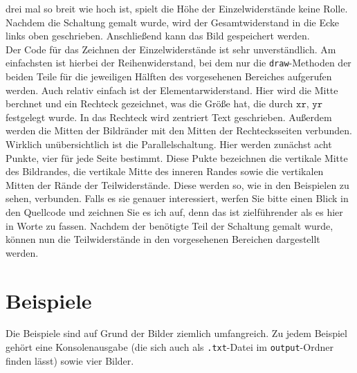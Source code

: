 \documentclass[a4paper,10pt,ngerman]{scrartcl}
\begin{document}
drei mal so breit wie hoch ist, spielt die H\"ohe der Einzelwiderst\"ande
keine Rolle.\\
\indent Nachdem die Schaltung gemalt wurde, wird der Gesamtwiderstand in die
Ecke links oben geschrieben. Anschlie\ss end kann das Bild gespeichert werden.\\
\indent Der Code f\"ur das Zeichnen der Einzelwiderst\"ande ist sehr
unverst\"andlich. Am einfachsten ist hierbei der Reihenwiderstand, bei dem
nur die \texttt{draw}-Methoden der beiden Teile f\"ur die jeweiligen H\"alften
des vorgesehenen Bereiches aufgerufen werden. Auch relativ einfach ist der
Elementarwiderstand. Hier wird die Mitte berchnet und ein Rechteck 
gezeichnet, was die Gr\"o\ss e hat, die durch $\texttt{xr, yr}$ festgelegt
wurde. In das Rechteck wird zentriert Text geschrieben. Au\ss erdem werden
die Mitten der Bildr\"ander mit den Mitten der Rechtecksseiten verbunden.\\
\indent Wirklich un\"ubersichtlich ist die Parallelschaltung. Hier werden
zun\"achst acht Punkte, vier f\"ur jede Seite bestimmt. Diese Pukte bezeichnen
die vertikale Mitte des Bildrandes, die vertikale Mitte des inneren Randes
sowie die vertikalen Mitten der R\"ande der Teilwiderst\"ande. Diese werden
so, wie in den Beispielen zu sehen, verbunden. Falls es sie genauer interessiert,
werfen Sie bitte einen Blick in den Quellcode und zeichnen Sie es ich auf, denn
das ist zielf\"uhrender als es hier in Worte zu fassen.
Nachdem der ben\"otigte Teil der Schaltung gemalt wurde, k\"onnen nun die
Teilwiderst\"ande in den vorgesehenen Bereichen dargestellt werden. 
\section{Beispiele}
Die Beispiele sind auf Grund der Bilder ziemlich umfangreich.
Zu jedem Beispiel geh\"ort eine Konsolenausgabe
(die sich auch als \texttt{.txt}-Datei im \texttt{output}-Ordner finden l\"asst)
sowie vier Bilder. 
\newcommand{\images}[1]{
  Bild f\"ur $k=1$:
  \begin{center}
    \texttt{[image: images/r\#1-k1.png]}  
  \end{center}
  Bild f\"ur $k=2$:
  \begin{center}
    \texttt{[image: images/r\#1-k2.png]}  
  \end{center}
  \pagebreak
  Bild f\"ur $k=3$:
  \begin{center}
    \texttt{[image: images/r\#1-k3.png]}  
  \end{center}
  Bild f\"ur $k=4$:
  \begin{center}
    \texttt{[image: images/r\#1-k4.png]}  
  \end{center}
}
\pagebreak
\end{document}
